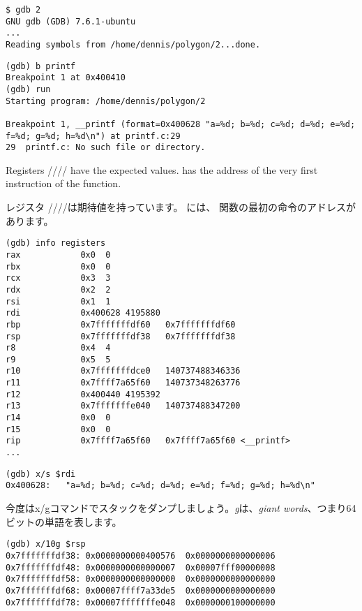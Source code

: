 \begin{lstlisting}
$ gdb 2
GNU gdb (GDB) 7.6.1-ubuntu
...
Reading symbols from /home/dennis/polygon/2...done.
\end{lstlisting}

\begin{lstlisting}[caption=ブレークポイントを \printf{} に設定して実行しましょう]
(gdb) b printf
Breakpoint 1 at 0x400410
(gdb) run
Starting program: /home/dennis/polygon/2 

Breakpoint 1, __printf (format=0x400628 "a=%d; b=%d; c=%d; d=%d; e=%d; f=%d; g=%d; h=%d\n") at printf.c:29
29	printf.c: No such file or directory.
\end{lstlisting}

Registers \RSI/\RDX/\RCX// have the expected values.
\RIP has the address of the very first instruction of the \printf function.

レジスタ \RSI/\RDX/\RCX//は期待値を持っています。
\RIP には、 \printf 関数の最初の命令のアドレスがあります。

\begin{lstlisting}
(gdb) info registers
rax            0x0	0
rbx            0x0	0
rcx            0x3	3
rdx            0x2	2
rsi            0x1	1
rdi            0x400628	4195880
rbp            0x7fffffffdf60	0x7fffffffdf60
rsp            0x7fffffffdf38	0x7fffffffdf38
r8             0x4	4
r9             0x5	5
r10            0x7fffffffdce0	140737488346336
r11            0x7ffff7a65f60	140737348263776
r12            0x400440	4195392
r13            0x7fffffffe040	140737488347200
r14            0x0	0
r15            0x0	0
rip            0x7ffff7a65f60	0x7ffff7a65f60 <__printf>
...
\end{lstlisting}

\begin{lstlisting}[caption=let's inspect the format string]
(gdb) x/s $rdi
0x400628:	"a=%d; b=%d; c=%d; d=%d; e=%d; f=%d; g=%d; h=%d\n"
\end{lstlisting}

今度はx/gコマンドでスタックをダンプしましょう。\emph{g}は、\emph{giant words}、つまり64ビットの単語を表します。

\begin{lstlisting}
(gdb) x/10g $rsp
0x7fffffffdf38:	0x0000000000400576	0x0000000000000006
0x7fffffffdf48:	0x0000000000000007	0x00007fff00000008
0x7fffffffdf58:	0x0000000000000000	0x0000000000000000
0x7fffffffdf68:	0x00007ffff7a33de5	0x0000000000000000
0x7fffffffdf78:	0x00007fffffffe048	0x0000000100000000
\end{lstlisting}

